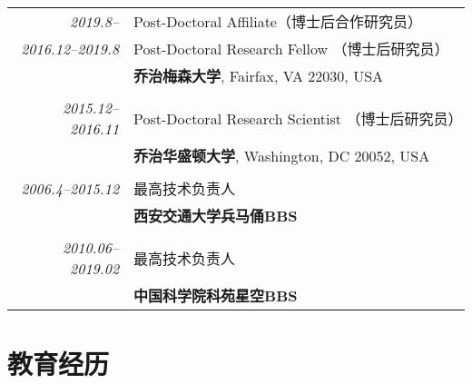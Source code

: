 \documentclass[paper=a4,fontsize=11pt]{scrartcl}
\begin{document}
\begin{tabular}{r|p{11cm}}

\emph{2019.8--} & Post-Doctoral Affiliate（博士后合作研究员）\\	
\emph{2016.12--2019.8} & Post-Doctoral Research Fellow （博士后研究员）\\
& \normalsize\textbf{乔治梅森大学}, Fairfax, VA 22030, USA\\
	\multicolumn{2}{c}{} \\


  \emph{2015.12--2016.11} & Post-Doctoral Research Scientist （博士后研究员）\\
  & \normalsize\textbf{乔治华盛顿大学}, Washington, DC 20052, USA\\
\multicolumn{2}{c}{} \\

  \emph{2006.4--2015.12} & 最高技术负责人\\
& \normalsize\textbf{西安交通大学兵马俑BBS}\\
\multicolumn{2}{c}{} \\

  \emph{2010.06--2019.02} & 最高技术负责人\\
& \normalsize\textbf{中国科学院科苑星空BBS}\\
	

\end{tabular}

\section*{教育经历}
\end{document}
